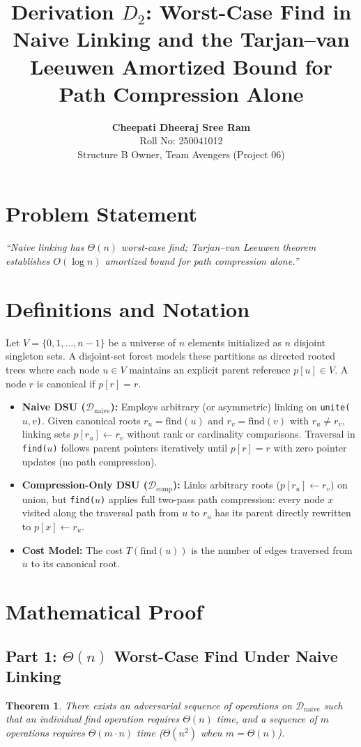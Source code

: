 \documentclass[11pt,a4paper]{article}
\title{\textbf{Derivation $D_2$: Worst-Case Find in Naive Linking and the Tarjan--van Leeuwen Amortized Bound for Path Compression Alone}}
\author{\textbf{Cheepati Dheeraj Sree Ram} \\ Roll No: 250041012 \\ Structure B Owner, Team Avengers (Project 06)}
\date{}
\newtheorem{theorem}{Theorem}
\begin{document}
\maketitle

\section{Problem Statement}
\textit{``Naive linking has $\Theta(n)$ worst-case find; Tarjan--van Leeuwen theorem establishes $O(\log n)$ amortized bound for path compression alone.''}

\section{Definitions and Notation}
Let $V = \{0, 1, \dots, n-1\}$ be a universe of $n$ elements initialized as $n$ disjoint singleton sets. A disjoint-set forest models these partitions as directed rooted trees where each node $u \in V$ maintains an explicit parent reference $p[u] \in V$. A node $r$ is canonical if $p[r] = r$.
\begin{itemize}
    \item \textbf{Naive DSU ($\mathcal{D}_{\text{naive}}$):} Employs arbitrary (or asymmetric) linking on \texttt{unite($u, v$)}. Given canonical roots $r_u = \text{find}(u)$ and $r_v = \text{find}(v)$ with $r_u \neq r_v$, linking sets $p[r_u] \leftarrow r_v$ without rank or cardinality comparisons. Traversal in \texttt{find($u$)} follows parent pointers iteratively until $p[r] = r$ with zero pointer updates (no path compression).
    \item \textbf{Compression-Only DSU ($\mathcal{D}_{\text{comp}}$):} Links arbitrary roots ($p[r_u] \leftarrow r_v$) on union, but \texttt{find($u$)} applies full two-pass path compression: every node $x$ visited along the traversal path from $u$ to $r_u$ has its parent directly rewritten to $p[x] \leftarrow r_u$.
    \item \textbf{Cost Model:} The cost $T(\text{find}(u))$ is the number of edges traversed from $u$ to its canonical root.
\end{itemize}

\section{Mathematical Proof}

\subsection{Part 1: $\Theta(n)$ Worst-Case Find Under Naive Linking}
\begin{theorem}
There exists an adversarial sequence of operations on $\mathcal{D}_{\text{naive}}$ such that an individual find operation requires $\Theta(n)$ time, and a sequence of $m$ operations requires $\Theta(m \cdot n)$ time ($\Theta(n^2)$ when $m = \Theta(n)$).
\end{theorem}
\end{document}
